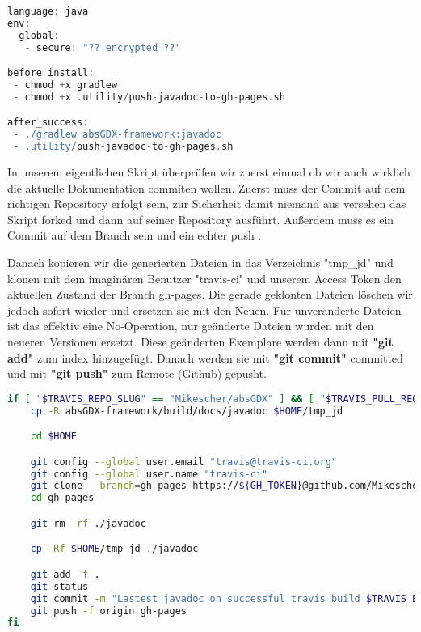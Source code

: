\doinline
\begin{lstlisting}[caption=TravisCI Konfiguration für das Erzeugen von JavaDoc, title=\hspace{0 pt}, language=groovy]
language: java
env:
  global:
   - secure: "?? encrypted ??"

before_install:
 - chmod +x gradlew
 - chmod +x .utility/push-javadoc-to-gh-pages.sh

after_success:
 - ./gradlew absGDX-framework:javadoc
 - .utility/push-javadoc-to-gh-pages.sh
\end{lstlisting}

In unserem eigentlichen Skript überprüfen wir zuerst einmal ob wir auch wirklich die aktuelle Dokumentation commiten wollen. Zuerst muss der Commit auf dem richtigen Repository erfolgt sein, zur Sicherheit damit niemand aus versehen das Skript forked und dann auf seiner Repository ausführt. Außerdem muss es ein Commit auf dem Branch  sein und ein echter push .

Danach kopieren wir die generierten Dateien in das Verzeichnis "tmp\_jd" und klonen mit dem imaginären Benutzer "travis-ci" und unserem Access Token den aktuellen Zustand der Branch gh-pages. 
Die gerade geklonten Dateien löschen wir jedoch sofort wieder und ersetzen sie mit den Neuen. 
Für unveränderte Dateien ist das effektiv eine No-Operation, nur geänderte Dateien wurden mit den neueren Versionen ersetzt. 
Diese geänderten Exemplare werden dann mit \textbf{"git add"} zum index hinzugefügt. 
Danach werden sie mit \textbf{"git commit"} committed und mit \textbf{"git push"} zum Remote (Github) gepusht.

\doinline
\begin{lstlisting}[caption=Das Javadoc Publish Bashscript, title=\hspace{0 pt}, language=bash]
if [ "$TRAVIS_REPO_SLUG" == "Mikescher/absGDX" ] && [ "$TRAVIS_PULL_REQUEST" == "false" ] && [ "$TRAVIS_BRANCH" == "master" ]; then
	cp -R absGDX-framework/build/docs/javadoc $HOME/tmp_jd

	cd $HOME

	git config --global user.email "travis@travis-ci.org"
	git config --global user.name "travis-ci"
	git clone --branch=gh-pages https://${GH_TOKEN}@github.com/Mikescher/absGDX gh-pages
	cd gh-pages

	git rm -rf ./javadoc

	cp -Rf $HOME/tmp_jd ./javadoc

	git add -f .
	git status
	git commit -m "Lastest javadoc on successful travis build $TRAVIS_BUILD_NUMBER auto-pushed to gh-pages"
	git push -f origin gh-pages
fi
\end{lstlisting}

